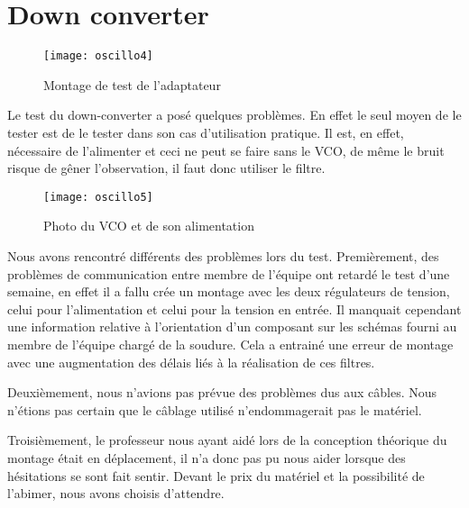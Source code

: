 \section{Down converter}
\label{sec:down_converter}



\begin{figure}[h]
  \centering
  \texttt{[image: oscillo4]}
  \caption{Montage de test de l’adaptateur}
  \label{fig:mont}
\end{figure}


Le test du down-converter a posé quelques problèmes. En effet le seul moyen de le tester est de le tester dans son cas d’utilisation pratique. Il est, en effet, nécessaire de l’alimenter et  ceci ne peut se faire sans le VCO, de même le bruit risque de gêner l’observation, il faut donc utiliser le filtre.


\begin{figure}[h]
  \centering
  \texttt{[image: oscillo5]}
  \caption{Photo du VCO et de son alimentation}
  \label{fig:photo}
\end{figure}



Nous avons rencontré différents des problèmes lors du test. Premièrement, des problèmes de communication entre membre de l’équipe ont retardé le test d’une semaine, en effet il a fallu crée un montage avec les deux régulateurs de tension, celui pour l’alimentation et celui pour la tension en entrée. Il manquait cependant une information relative à l'orientation d'un composant sur les schémas fourni au membre de l'équipe chargé de la soudure. Cela a entrainé une erreur de montage avec une augmentation des délais liés à la réalisation de ces filtres.

Deuxièmement, nous n’avions pas prévue des problèmes dus aux câbles. Nous n'étions pas certain que le câblage utilisé n'endommagerait pas le matériel.

Troisièmement, le professeur nous ayant aidé lors de la conception théorique du montage était en déplacement, il n’a donc pas pu nous aider lorsque des hésitations se sont fait sentir. Devant le prix du matériel et la possibilité de l'abimer, nous avons choisis d'attendre.





